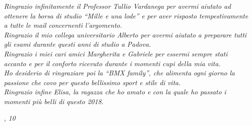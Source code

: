 \noindent \textit{Ringrazio infinitamente il Professor Tullio Vardanega per avermi aiutato ad ottenere la borsa di studio ``Mille e una lode'' e per aver risposto tempestivamente a tutte le mail concernenti l'argomento.}\\

\noindent \textit{Ringrazio il mio collega universitario Alberto per avermi aiutato a preparare tutti gli esami durante questi anni di studio a Padova.}\\

\noindent \textit{Ringrazio i miei cari amici Margherita e Gabriele per essermi sempre stati accanto e per il conforto ricevuto durante i momenti cupi della mia vita.}\\

\noindent \textit{Ho desiderio di ringraziare poi la ``BMX family'', che alimenta ogni giorno la passione che covo per questo bellissimo sport e stile di vita.}\\

\noindent \textit{Ringrazio infine Elisa, la ragazza che ho amato e con la quale ho passato i momenti più belli di questo 2018.}
\bigskip

\noindent\textit{\myLocation{}, 10 \myTime{}}
\hfill \myName

\endgroup


